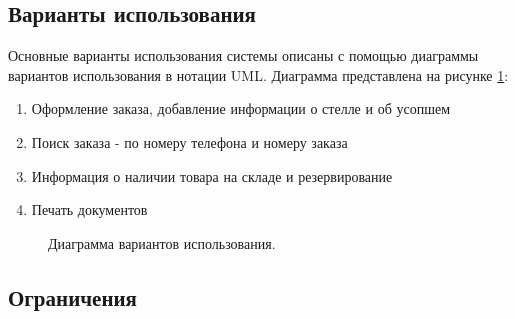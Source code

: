 \documentclass[a4paper,article,14pt]{extarticle}
\begin{document}
\subsection{Варианты использования}

Основные варианты использования системы описаны с помощью диаграммы вариантов использования в нотации UML.
Диаграмма представлена на рисунке \ref{uml2}:

\begin{enumerate}
    \item Оформление заказа, добавление информации о стелле и об усопшем 
    \item Поиск заказа - по номеру телефона и номеру заказа
    \item Информация о наличии товара на складе и резервирование
    \item Печать документов
\end{enumerate}

\begin{figure}[ht]
\begin{center}
\caption{\label{uml2} Диаграмма вариантов использования.}
\end {center}
\end {figure}
    
\subsection{Ограничения}
\end{document}
